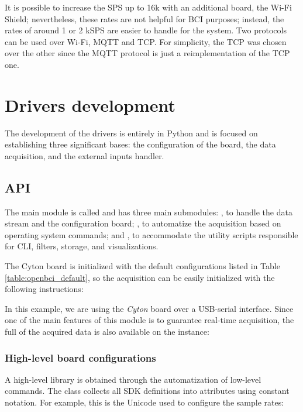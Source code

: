 It is possible to increase the \gls*{SPS} up to 16k with an additional board, the Wi-Fi Shield; nevertheless, these rates are not helpful for \gls*{BCI} purposes; instead, the rates of around 1 or 2 k\gls*{SPS} are easier to handle for the system. Two protocols can be used over Wi-Fi, \Gls*{MQTT} and \gls*{TCP}. For simplicity, the \gls*{TCP} was chosen over the other since the \gls*{MQTT} protocol is just a reimplementation of the \gls*{TCP} one.

\section{Drivers development}

The development of the drivers is entirely in Python and is focused on establishing three significant bases: the configuration of the board, the data acquisition, and the external inputs handler.

\subsection{\Gls*{API}}

The main module is called  and has three main submodules: , to handle the data stream and the configuration board; , to automatize the acquisition based on operating system commands; and , to accommodate the utility scripts responsible for \gls*{CLI}, filters, storage, and visualizations. 

The Cyton board is initialized with the default configurations listed in Table \ref{table:openbci_default}, so the acquisition can be easily initialized with the following instructions:




In this example, we are using the \textit{Cyton} board over a USB-serial interface. Since one of the main features of this module is to guarantee real-time acquisition, the full  of the acquired data is also available on the  instance:



\subsubsection{High-level board configurations}
A high-level library is obtained through the automatization of low-level commands. The  class collects all \gls*{SDK} definitions into attributes using constant notation. For example, this is the Unicode used to configure the sample rates:

